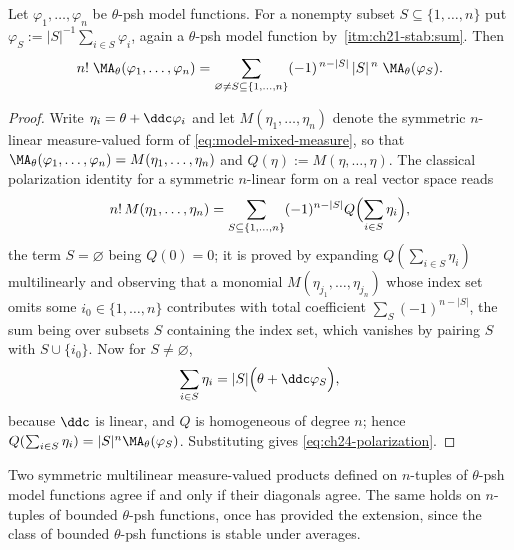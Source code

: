 \begin{proposition}
\label{prop:ch24-polarization}
Let \(\varphi_1,\ldots,\varphi_n\) be \(\theta\)-psh model functions.  For a
nonempty subset \(S\subseteq\{1,\ldots,n\}\) put
\(\varphi_S:=|S|^{-1}\sum_{i\in S}\varphi_i\), again a \(\theta\)-psh model
function by \,\cref{itm:ch21-stab:sum}.  Then
\begin{equation}
\label{eq:ch24-polarization}
 n!\;\MA_\theta(\varphi_1,\ldots,\varphi_n)
 =\sum_{\varnothing\neq S\subseteq\{1,\ldots,n\}}
   (-1)^{\,n-|S|}\,|S|^{\,n}\;\MA_\theta(\varphi_S).
\end{equation}
\end{proposition}

\begin{proof}
Write \(\eta_i=\theta+\ddc\varphi_i\) and let
\(M(\eta_1,\ldots,\eta_n)\) denote the symmetric \(n\)-linear
measure-valued form of \eqref{eq:model-mixed-measure}, so that
\(\MA_\theta(\varphi_1,\ldots,\varphi_n)=M(\eta_1,\ldots,\eta_n)\) and
\(Q(\eta):=M(\eta,\ldots,\eta)\).  The classical polarization identity for a
symmetric \(n\)-linear form on a real vector space reads
\[
 n!\,M(\eta_1,\ldots,\eta_n)
 =\sum_{S\subseteq\{1,\ldots,n\}}(-1)^{n-|S|}
   Q\Bigl(\sum_{i\in S}\eta_i\Bigr),
\]
the term \(S=\varnothing\) being \(Q(0)=0\); it is proved by expanding
\(Q(\sum_{i\in S}\eta_i)\) multilinearly and observing that a monomial
\(M(\eta_{j_1},\ldots,\eta_{j_n})\) whose index set omits some
\(i_0\in\{1,\ldots,n\}\) contributes with total coefficient
\(\sum_{S}(-1)^{n-|S|}\), the sum being over subsets \(S\) containing the
index set, which vanishes by pairing \(S\) with \(S\cup\{i_0\}\).  Now for
\(S\neq\varnothing\),
\[
 \sum_{i\in S}\eta_i=|S|\Bigl(\theta+\ddc\varphi_S\Bigr),
\]
because \(\ddc\) is linear, and \(Q\) is homogeneous of degree \(n\); hence
\(Q(\sum_{i\in S}\eta_i)=|S|^n\MA_\theta(\varphi_S)\).  Substituting gives
\eqref{eq:ch24-polarization}.
\end{proof}

\begin{corollary}\label{cor:ch24-mixed-from-diagonal}
Two symmetric multilinear measure-valued products defined on \(n\)-tuples of
\(\theta\)-psh model functions agree if and only if their diagonals agree.
The same holds on \(n\)-tuples of bounded \(\theta\)-psh functions, once
 has provided the extension, since the class
of bounded \(\theta\)-psh functions is stable under averages.
\end{corollary}

